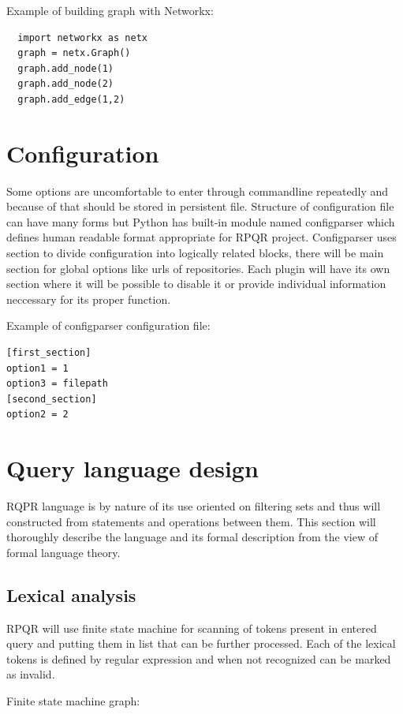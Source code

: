 Example of building graph with Networkx:
\begin{lstlisting}
  import networkx as netx
  graph = netx.Graph()
  graph.add_node(1)
  graph.add_node(2)
  graph.add_edge(1,2)
\end{lstlisting}

\section*{Configuration}
Some options are uncomfortable to enter through commandline repeatedly and because of that should
be stored in persistent file. Structure of configuration file can have many forms but Python has
built-in module named configparser which defines human readable format appropriate for RPQR project.
Configparser uses section to divide configuration into logically related blocks, there will be
main section for global options like urls of repositories. Each plugin will have its own section
where it will be possible to disable it or provide individual information neccessary for its proper
function.

Example of configparser configuration file:
\begin{lstlisting}
[first_section]
option1 = 1
option3 = filepath
[second_section]
option2 = 2
\end{lstlisting}

\newpage

\section{Query language design}
RQPR language is by nature of its use oriented on filtering sets and thus will constructed from
statements and operations between them. This section will thoroughly describe the language and
its formal description from the view of formal language theory.

\subsection*{Lexical analysis}
RPQR will use finite state machine for scanning of tokens present in entered query and putting them
in list that can be further processed. Each of the lexical tokens is defined by regular expression
and when not recognized can be marked as invalid.

Finite state machine graph:

